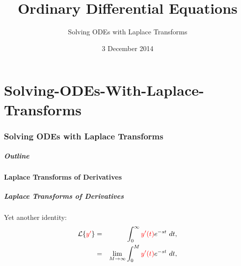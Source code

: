 \part{Solving-ODEs-With-Laplace-Transforms}
\section{Solving ODEs with Laplace Transforms}

\title{Ordinary Differential Equations}
\subtitle{Solving ODEs with Laplace Transforms}
\date{3 December 2014}

\begin{frame}
  \titlepage
\end{frame}

\begin{frame}
  \frametitle{Outline}
  \tableofcontents[ currentsection ]
\end{frame}


\subsection{Laplace Transforms of Derivatives}


\begin{frame}
  \frametitle{Laplace Transforms of Derivatives}

  Yet another identity:
  \begin{eqnarray*}
    \laplace{\redText{y'}} & = & \int^\infty_0 \redText{y'(t)} e^{-st} ~ dt, \\
    & = & \lim_{M\rightarrow\infty} \int^M_0 \redText{y'(t)} e^{-st} ~ dt, \\
    \end{eqnarray*}


\end{frame}

